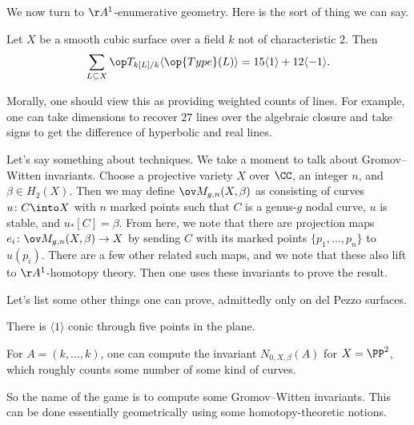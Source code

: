 \documentclass{article}
\begin{document}
We now turn to $\AA^1$-enumerative geometry. Here is the sort of thing we can say.
\begin{theorem}
	Let $X$ be a smooth cubic surface over a field $k$ not of characteristic $2$. Then
	\[\sum_{L\subseteq X}\op T_{k[L]/k}\langle\op{Type}(L)\rangle=15\langle1\rangle+12\langle-1\rangle.\]
\end{theorem}
Morally, one should view this as providing weighted counts of lines. For example, one can take dimensions to recover $27$ lines over the algebraic closure and take signs to get the difference of hyperbolic and real lines.

Let's say something about techniques. We take a moment to talk about Gromov--Witten invariants. Choose a projective variety $X$ over $\CC$, an integer $n$, and $\beta\in H_2(X)$. Then we may define $\ov M_{g,n}(X,\beta)$ as consisting of curves $u\colon C\into X$ with $n$ marked points such that $C$ is a genus-$g$ nodal curve, $u$ is stable, and $u_*[C]=\beta$. From here, we note that there are projection maps $e_i\colon\ov M_{g,n}(X,\beta)\to X$ by sending $C$ with its marked points $\{p_1,\ldots,p_n\}$ to $u(p_i)$. There are a few other related such maps, and we note that these also lift to $\AA^1$-homotopy theory. Then one uses these invariants to prove the result.

Let's list some other things one can prove, admittedly only on del Pezzo surfaces.
\begin{example}
	There is $\langle1\rangle$ conic through five points in the plane.
\end{example}
\begin{example}
	For $A=(k,\ldots,k)$, one can compute the invariant $N_{0,X,\beta}(A)$ for $X=\PP^2$, which roughly counts some number of some kind of curves.
\end{example}
So the name of the game is to compute some Gromov--Witten invariants. This can be done essentially geometrically using some homotopy-theoretic notions.
\end{document}
